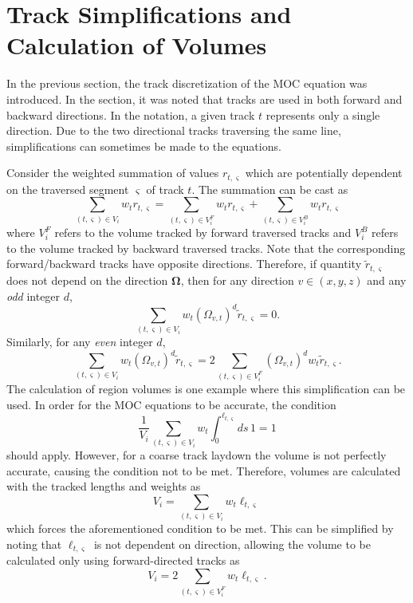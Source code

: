 \section{Track Simplifications and Calculation of Volumes}
\label{sec:track-simplifications}

In the previous section, the track discretization of the \ac{MOC} equation was introduced. In the section, it was noted that tracks are used in both forward and backward directions. In the notation, a given track $t$ represents only a single direction. Due to the two directional tracks traversing the same line, simplifications can sometimes be made to the equations.

Consider the weighted summation of values $r_{t,\varsigma}$ which are potentially dependent on the traversed segment $\varsigma$ of track $t$. The summation can be cast as
\begin{equation}
	\sum_{(t,\varsigma) \in V_i} w_t r_{t,\varsigma} = \sum_{(t,\varsigma) \in V^F_i} w_t r_{t,\varsigma} + \sum_{(t,\varsigma) \in V^B_i} w_t r_{t,\varsigma}
\end{equation}
where $V^F_i$ refers to the volume tracked by forward traversed tracks and $V^B_i$ refers to the volume tracked by backward traversed tracks. Note that the corresponding forward/backward tracks have opposite directions. Therefore, if quantity $\tilde{r}_{t,\varsigma}$ does not depend on the direction $\mathbf{\Omega}$, then for any direction $v \in (x,y,z)$ and any \textit{odd} integer $d$,
\begin{equation}
\sum_{(t,\varsigma) \in V_i} w_t \left(\Omega_{v,t}\right)^d \tilde{r}_{t,\varsigma} = 0.
\end{equation}
Similarly, for any \textit{even} integer $d$,
\begin{equation}
\sum_{(t,\varsigma) \in V_i} w_t \left(\Omega_{v,t}\right)^d \tilde{r}_{t,\varsigma} = 2 \sum_{(t,\varsigma) \in V^F_i} \left(\Omega_{v,t}\right)^d w_t \tilde{r}_{t,\varsigma}.
\end{equation}
The calculation of region volumes is one example where this simplification can be used. In order for the \ac{MOC} equations to be accurate, the condition
\begin{dmath}
	\frac{1}{V_i} \sum_{(t,\varsigma) \in V_i} w_{t} \int_{0}^{\ell_{t,\varsigma}} ds \, 1 = 1
\end{dmath}
should apply. However, for a coarse track laydown the volume is not perfectly accurate, causing the condition not to be met. Therefore, volumes are calculated with the tracked lengths and weights as
\begin{dmath}
	V_i = \sum_{(t,\varsigma) \in V_i} w_{t} \ell_{t,\varsigma}
\end{dmath}
which forces the aforementioned condition to be met. This can be simplified by noting that $\ell_{t,\varsigma}$ is not dependent on direction, allowing the volume to be calculated only using forward-directed tracks as
\begin{equation}
V_i = 2 \sum_{(t,\varsigma) \in V^F_i} w_{t} \ell_{t,\varsigma}.
\end{equation}

